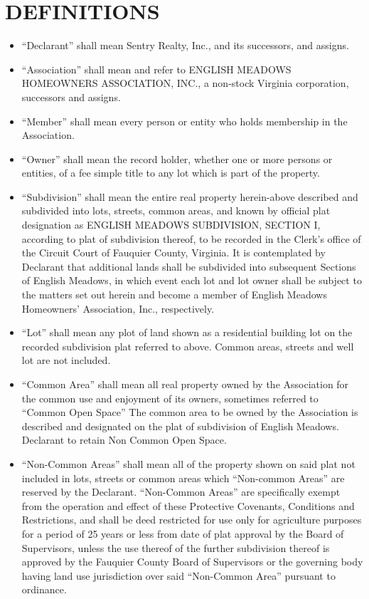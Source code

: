 \documentclass[10pt, letterpaper]{article}
\begin{document}
\section{DEFINITIONS}
\begin{itemize}
  \item ``Declarant'' shall mean Sentry Realty, Inc., and its successors, and assigns.
  \item ``Association'' shall mean and refer to ENGLISH MEADOWS HOMEOWNERS ASSOCIATION, INC., a non-stock Virginia corporation, successors and assigns.
  \item ``Member'' shall mean every person or entity who holds membership in the Association.
  \item ``Owner'' shall mean the record holder, whether one or more persons or entities, of a fee simple title to any lot which is part of the property.
  \item ``Subdivision'' shall mean the entire real property herein-above described and subdivided into lots, streets, common areas, and known by official plat designation as ENGLISH MEADOWS SUBDIVISION, SECTION I, according to plat of subdivision thereof, to be recorded in the Clerk's office of the Circuit Court of Fauquier County, Virginia.
    It is contemplated by Declarant that additional lands shall be subdivided into subsequent Sections of English Meadows, in which event each lot and lot owner shall be subject to the matters set out herein and become a member of English Meadows Homeowners' Association, Inc., respectively.
  \item ``Lot'' shall mean any plot of land shown as a residential building lot on the recorded subdivision plat referred to above.
    Common areas, streets and well lot are not included.
  \item ``Common Area'' shall mean all real property owned by the Association for the common use and enjoyment of its owners, sometimes referred to ``Common Open Space''
    The common area to be owned by the Association is described and designated on the plat of subdivision of English Meadows.
    Declarant to retain Non Common Open Space.
  \item ``Non-Common Areas'' shall mean all of the property shown on said plat not included in lots, streets or common areas which ``Non-common Areas'' are reserved by the Declarant.
    ``Non-Common Areas'' are specifically exempt from the operation and effect of these Protective Covenants, Conditions and Restrictions, and shall be deed restricted for use only for agriculture purposes for a period of 25 years or less from date of plat approval by the Board of Supervisors, unless the use thereof of the further subdivision thereof is approved by the Fauquier County Board of Supervisors or the governing body having land use jurisdiction over said ``Non-Common Area'' pursuant to ordinance.
\end{itemize}
\end{document}
